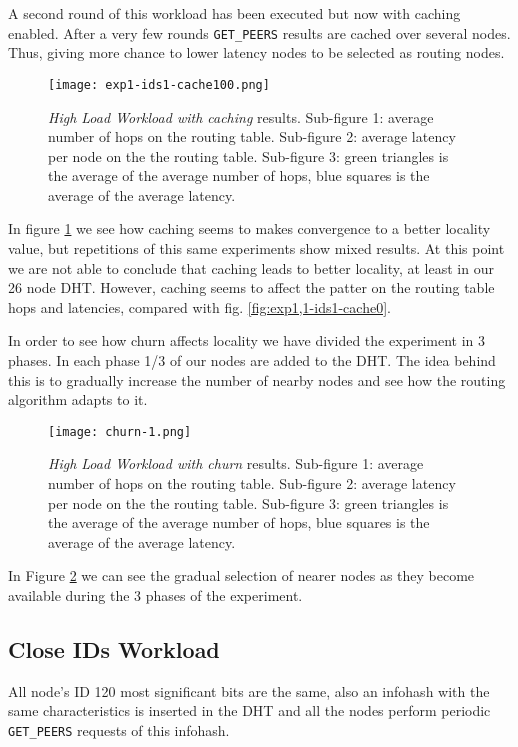 \documentclass[conference]{IEEEtran}
\begin{document}
A second round of this workload has been executed but now with caching enabled. After a very few rounds \texttt{GET\_PEERS} results are cached over several nodes. Thus, giving more chance to lower latency nodes to be selected as routing nodes.

\begin{figure}
    \texttt{[image: exp1-ids1-cache100.png]}
    \caption{\textit{High Load Workload with caching} results. Sub-figure 1: average number of hops on the routing table. Sub-figure 2: average latency per node on the the routing table. Sub-figure 3: green triangles is the average of the average number of hops, blue squares is the average of the average latency.}
    \label{fig:exp1-ids1-cache100}
\end{figure}

In figure \ref{fig:exp1-ids1-cache100} we see how caching seems to makes convergence to a better locality value, but repetitions of this same experiments show mixed results. At this point we are not able to conclude that caching leads to better locality, at least in our 26 node DHT. However, caching seems to affect the patter on the routing table hops and latencies, compared with fig. \ref{fig:exp1,1-ids1-cache0}.

In order to see how churn affects locality we have divided the experiment in 3 phases. In each phase 1/3 of our nodes are added to the DHT. The idea behind this is to gradually increase the number of nearby nodes and see how the routing algorithm adapts to it.

\begin{figure}
    \texttt{[image: churn-1.png]}
    \caption{\textit{High Load Workload with churn} results. Sub-figure 1: average number of hops on the routing table. Sub-figure 2: average latency per node on the the routing table. Sub-figure 3: green triangles is the average of the average number of hops, blue squares is the average of the average latency.}
    \label{fig:churn-1}
\end{figure}

In Figure \ref{fig:churn-1} we can see the gradual selection of nearer nodes as they become available during the 3 phases of the experiment.

\subsection{Close IDs Workload}

All node's ID 120 most significant bits are the same, also an infohash with the same characteristics is inserted in the DHT and all the nodes perform periodic \texttt{GET\_PEERS} requests of this infohash.
\end{document}
